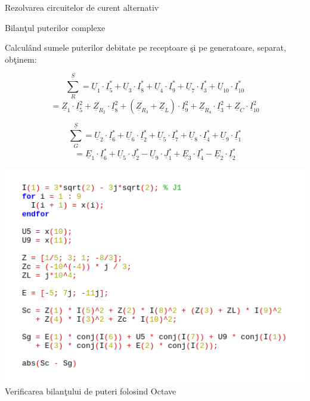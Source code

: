 \documentclass[a4paper]{article}
\begin{document}
\begin{section}{Rezolvarea circuitelor de curent alternativ}
\begin{subsection}{Bilan\c tul puterilor complexe \\}

	Calcul\^ and sumele puterilor debitate pe receptoare \c si pe generatoare, separat, ob\c tinem:
\begin{large}
	$$ \sum_R^{\underline{S}}  = \underline{U}_1 \cdot \underline{I}_5^* + \underline{U}_3 \cdot \underline{I}_8^* + \underline{U}_4 \cdot \underline{I}_9^* + \underline{U}_7 \cdot \underline{I}_3^*  + \underline{U}_{10} \cdot \underline{I}_{10}^* $$
	$$ = \underline{Z}_1 \cdot \underline{I}_5^2 + \underline{Z}_{R_2} \cdot \underline{I}_8^2 + (\underline{Z}_{R_3} + \underline{Z}_L) \cdot \underline{I}_9^2 + \underline{Z}_{R_4} \cdot \underline{I}_3^2 + \underline{Z}_C \cdot \underline{I}_{10}^2 $$

	$$ \sum_G^{\underline{S}}  = \underline{U}_2 \cdot \underline{I}_6^* + \underline{U}_6 \cdot \underline{I}_2^* + \underline{U}_5 \cdot \underline{I}_7^* + \underline{U}_8 \cdot \underline{I}_4^*  + \underline{U}_9 \cdot \underline{I}_1^* $$ 
	$$ = \underline{E}_1 \cdot \underline{I}_6^* + \underline{U}_5 \cdot \underline{J}_2^* - \underline{U}_9 \cdot \underline{J}_1^* + \underline{E}_3 \cdot \underline{I}_4^* - \underline{E}_2 \cdot \underline{I}_2^* $$
\end{large} 

\begin{center}
	\includegraphics[width=14cm, height=9.5cm]{bilant.png}
	Verificarea bilan\c tului de puteri folosind Octave \\[1.5cm]
\end{center}
\pagebreak
\end{subsection}


\end{section}
\end{document}
